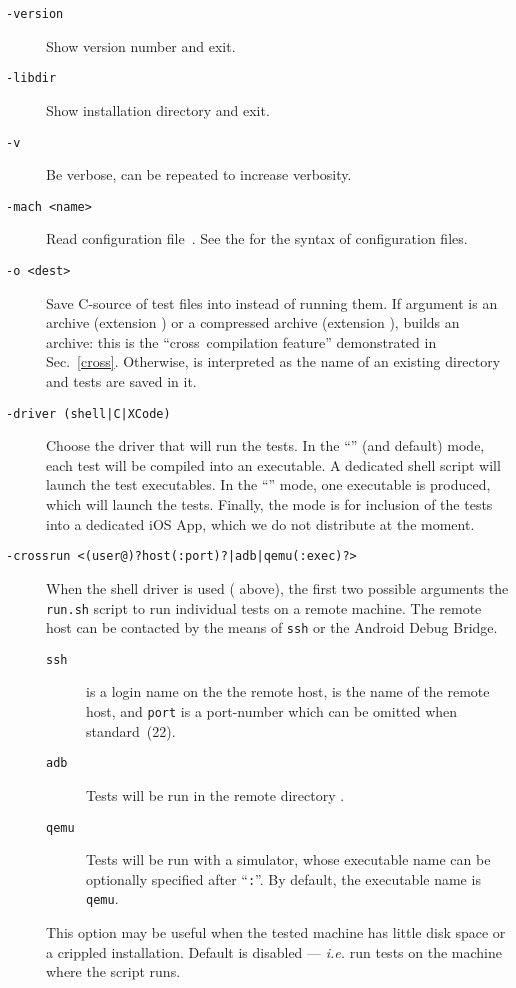 \begin{description}
\item[{\tt -version}] Show version number and exit.
\item[{\tt -libdir}] Show installation directory and exit.
\item[{\tt -v}] Be verbose, can be repeated to increase verbosity.
\item[{\tt -mach <name>}] Read configuration file~.
See the 
for the syntax of configuration files.
\item[{\tt -o <dest>}]
Save C-source of test files into  instead of running them.
If  argument  is an archive (extension )
or a compressed archive (extension ),
\litmus{} builds an archive: this is the ``cross~compilation feature''
demonstrated in Sec.~\ref{cross}.
Otherwise,  is interpreted as the name of an
existing directory and tests are saved in it.
\item[{\tt -driver (shell|C|XCode)}]
Choose the driver that will run the tests.
In the ``'' (and default) mode,
each test will be compiled into an executable. A dedicated shell script
 will launch the test executables.
In the ``'' mode, one executable  is produced, which
will launch the tests.
Finally, the  mode is for inclusion of the tests into
a dedicated iOS App, which we do not distribute at the moment.
\item[{\tt -crossrun <(user@)?host(:port)?|adb|qemu(:exec)?>}]
When the shell driver is used ( above),
the first two possible arguments 
the \texttt{run.sh} script to run individual tests on a remote machine.
The remote host can be contacted by the means of \texttt{ssh}
or the Android Debug Bridge.
\begin{description}
\item[\tt ssh]
 is a login name on the the remote host,
 is the name of the remote host,
and \texttt{port} is a port-number which can be omitted when standard~(22).
\item[\tt adb]
Tests will be run in the remote directory .
\item[\tt qemu] Tests will be run with a simulator, whose executable name
can be optionally specified after ``\texttt{:}''.
By default, the executable name is \texttt{qemu}.
\end{description}
This option may be useful when the tested machine has little disk space or a
crippled installation.
Default is disabled --- \emph{i.e.} run tests on
the machine where the  script runs.


\end{description}
